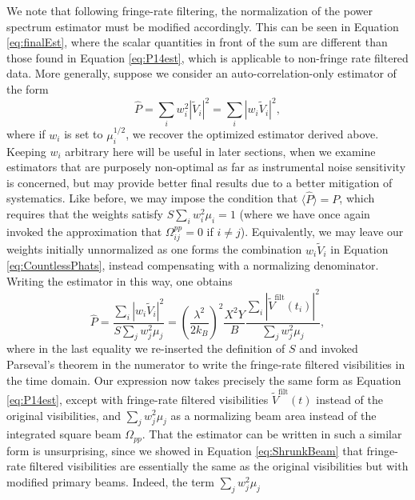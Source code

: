 \documentclass[twocolumn,apj,numberedappendix]{emulateapj}
\begin{document}
We note that following fringe-rate filtering, the normalization of the power
spectrum estimator must be modified accordingly. This can be seen in Equation
\eqref{eq:finalEst}, where the scalar quantities in front of the sum are
different than those found in Equation \eqref{eq:P14est}, which is applicable
to non-fringe rate filtered data. More generally, suppose we consider an
auto-correlation-only estimator of the form
\begin{equation}
\label{eq:CountlessPhats}
\widehat{P} = \sum_{i} w_{i}^2 | \widetilde{V}_i |^2 = \sum_i | w_i \widetilde{V}_i |^2,
\end{equation}
where if $w_i$ is set to $\mu_i^{1/2}$, we recover the optimized estimator derived
above. Keeping $w_i$ arbitrary here will be useful in later sections,
when we examine estimators that are purposely non-optimal as far as
instrumental noise sensitivity is concerned, but may provide
better final results due to a better mitigation of systematics. Like before,
we may impose the condition that $\langle \widehat{P} \rangle = P$, which
requires that the weights satisfy $S \sum_i w_i^2 \mu_i = 1$ (where we have
once again invoked the approximation that $\Omega_{ij}^{pp}=0$ if $i \neq j$).
Equivalently, we may leave our weights initially unnormalized as one forms
the combination $w_i \widetilde{V}_i $ in Equation \eqref{eq:CountlessPhats},
instead compensating with a normalizing denominator. Writing the estimator
in this way, one obtains
\begin{equation}
\label{eq:DunnoWhatToCallThis}
\widehat{P} = \frac{\sum_i | w_i \widetilde{V}_i |^2}{S \sum_j w_j^2 \mu_j} =\left( \frac{\lambda^2}{2 k_B} \right)^2 \frac{X^2 Y}{ B}   \frac{\sum_i | \widetilde{V}^\textrm{filt} (t_i) |^2}{\sum_j w_j^2 \mu_j},
\end{equation}
where in the last equality we re-inserted the definition of $S$ and invoked Parseval's theorem in the numerator
to write the fringe-rate filtered visibilities in the time domain. Our expression now takes precisely the same form
as Equation \eqref{eq:P14est}, except with fringe-rate filtered visibilities $\widetilde{V}^\textrm{filt} (t)$ instead 
of the original visibilities, and $\sum_j w_j^2 \mu_j$ as a normalizing beam area instead of the integrated square
beam $\Omega_{pp}$. That the estimator can be written in such a similar form is unsurprising,
since we showed in Equation \eqref{eq:ShrunkBeam} that fringe-rate filtered visibilities are essentially
the same as the original visibilities but with modified primary beams. Indeed, the term $\sum_j w_j^2 \mu_j$
\end{document}
